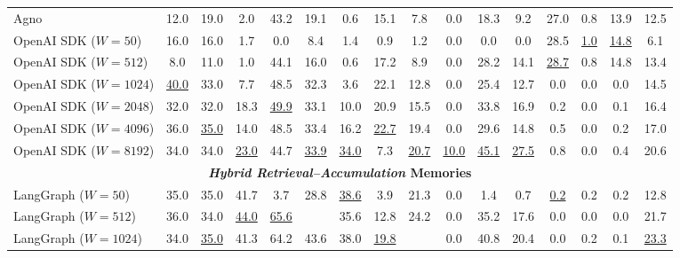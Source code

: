 \begin{table}[t]
\begin{tabular}{
    l|
    *{5}{c}|  %
    *{3}{c}|  %
    *{3}{c}|  %
    *{3}{c}|  %
    c         %
}
Agno & 12.0 & 19.0 & 2.0 & 43.2 & 19.1 & 0.6 & 15.1 & 7.8 & 0.0 & 18.3 & 9.2 & 27.0 & 0.8 & 13.9 & 12.5 \\


OpenAI SDK ($W=50$) & 16.0 & 16.0 & 1.7 & 0.0 & 8.4 & 1.4 & 0.9 & 1.2 & 0.0 & 0.0 & 0.0 & 28.5 & \underline{1.0} & \underline{14.8} & 6.1 \\

OpenAI SDK ($W=512$) & 8.0 & 11.0 & 1.0 & 44.1 & 16.0 & 0.6 & 17.2 & 8.9 & 0.0 & 28.2 & 14.1 & \underline{28.7} & 0.8 & 14.8 & 13.4 \\

OpenAI SDK ($W=1024$) & \underline{40.0} & 33.0 & 7.7 & 48.5 & 32.3 & 3.6 & 22.1 & 12.8 & 0.0 & 25.4 & 12.7 & 0.0 & 0.0 & 0.0 & 14.5 \\

OpenAI SDK ($W=2048$) & 32.0 & 32.0 & 18.3 & \underline{49.9} & 33.1 & 10.0 & 20.9 & 15.5 & 0.0 & 33.8 & 16.9 & 0.2 & 0.0 & 0.1 & 16.4 \\

OpenAI SDK ($W=4096$) & 36.0 & \underline{35.0} & 14.0 & 48.5 & 33.4 & 16.2 & \underline{22.7} & 19.4 & 0.0 & 29.6 & 14.8 & 0.5 & 0.0 & 0.2 & 17.0 \\

OpenAI SDK ($W=8192$) & 34.0 & 34.0 & \underline{23.0} & 44.7 & \underline{33.9} & \underline{34.0} & 7.3 & \underline{20.7} & \underline{10.0} & \underline{45.1} & \underline{27.5} & 0.8 & 0.0 & 0.4 & 20.6 \\


\multicolumn{16}{c}{\cellcolor{gray!30}\textbf{\emph{Hybrid Retrieval–Accumulation} Memories}} \\


LangGraph ($W=50$) & 35.0 & 35.0 & 41.7 & 3.7 & 28.8 & \underline{38.6} & 3.9 & 21.3 & 0.0 & 1.4 & 0.7 & \underline{0.2} & 0.2 & 0.2 & 12.8 \\



LangGraph ($W=512$) & 36.0 & 34.0 & \underline{44.0} & \underline{65.6} & \cellcolor{YellowGreen!30}{\textbf{\underline{44.9}}} & 35.6 & 12.8 & 24.2 & 0.0 & 35.2 & 17.6 & 0.0 & 0.0 & 0.0 & 21.7 \\


LangGraph ($W=1024$)  & 34.0 & \underline{35.0} & 41.3 & 64.2 & 43.6 & 38.0 & \underline{19.8} & \cellcolor{YellowGreen!30}{\textbf{\underline{28.9}}} & 0.0 & 40.8 & 20.4 & 0.0 & 0.2 & 0.1 & \underline{23.3} \\



\end{tabular}
\end{table}
